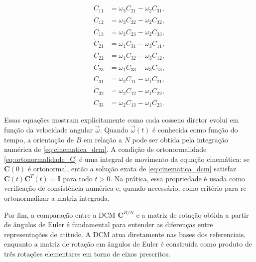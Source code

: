\begin{equation}
\begin{matrix}
    \dot{C}_{11} &= \omega_3 C_{21} - \omega_2 C_{31}, \\
    \dot{C}_{12} &= \omega_3 C_{22} - \omega_2 C_{32}, \\
    \dot{C}_{13} &= \omega_3 C_{23} - \omega_2 C_{33}, \\
    \dot{C}_{21} &= \omega_1 C_{31} - \omega_3 C_{11}, \\
    \dot{C}_{22} &= \omega_1 C_{32} - \omega_3 C_{12}, \\
    \dot{C}_{23} &= \omega_1 C_{33} - \omega_3 C_{13}, \\
    \dot{C}_{31} &= \omega_2 C_{11} - \omega_1 C_{21}, \\
    \dot{C}_{32} &= \omega_2 C_{12} - \omega_1 C_{22}, \\
    \dot{C}_{33} &= \omega_2 C_{13} - \omega_1 C_{23}.
\end{matrix}
\end{equation}

Essas equações mostram explicitamente como cada cosseno diretor evolui em
função da velocidade angular $\vec{\omega}$.
Quando $\vec{\omega}(t)$ é conhecida como função do tempo, a orientação de $B$ em relação a $N$ pode ser obtida pela integração numérica de \eqref{eq:cinematica_dcm}.
A condição de ortonormalidade \eqref{eq:ortonormalidade_C} é uma integral de movimento da equação cinemática: se $\mathbf{C}(0)$ é ortonormal, então a solução exata de \eqref{eq:cinematica_dcm} satisfaz $\mathbf{C}(t)\mathbf{C}^{T}(t)=\mathbf{I}$ para todo $t>0$. Na prática, essa propriedade é usada como verificação de consistência numérica e, quando necessário, como critério para re-ortonormalizar a matriz integrada.

Por fim, a comparação entre a DCM $\mathbf{C}^{B/N}$ e a matriz de rotação obtida a partir de ângulos de Euler é fundamental para entender as diferenças entre representações de atitude. A DCM atua diretamente nas bases dos referenciais, enquanto a matriz de rotação em ângulos de Euler é construída como produto de três rotações elementares em torno de eixos prescritos. 